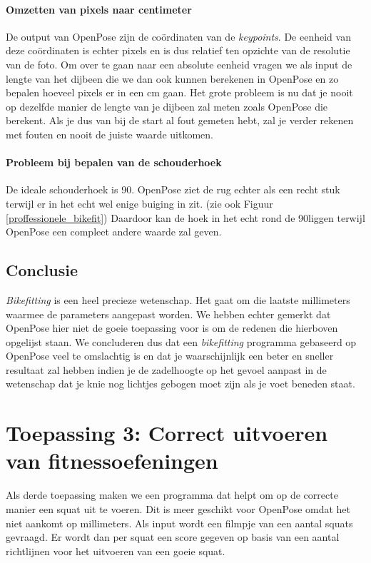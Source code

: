 \documentclass[a4paper,twoside,kulak]{kulakreport}
\begin{document}
\paragraph{Omzetten van pixels naar centimeter}
De output van OpenPose zijn de coördinaten van de \textit{keypoints}. De eenheid van deze coördinaten is echter pixels en is dus relatief ten opzichte van de resolutie van de foto. Om over te gaan naar een absolute eenheid vragen we als input de lengte van het dijbeen die we dan ook kunnen berekenen in OpenPose en zo bepalen hoeveel pixels er in een \si{cm} gaan. Het grote probleem is nu dat je nooit op dezelfde manier de lengte van je dijbeen zal meten zoals OpenPose die berekent. Als je dus van bij de start al fout gemeten hebt, zal je verder rekenen met fouten en nooit de juiste waarde uitkomen.

\paragraph{Probleem bij bepalen van de schouderhoek}
De ideale schouderhoek is 90\degree. OpenPose ziet de rug echter als een recht stuk terwijl er in het echt wel enige buiging in zit. (zie ook Figuur \ref{proffessionele_bikefit}) Daardoor kan de hoek in het echt rond de 90\degree liggen terwijl OpenPose een compleet andere waarde zal geven.

\subsection{Conclusie}
\textit{Bikefitting} is een heel precieze wetenschap. Het gaat om die laatste millimeters waarmee de parameters aangepast worden. We hebben echter gemerkt dat OpenPose hier niet de goeie toepassing voor is om de redenen die hierboven opgelijst staan. We concluderen dus dat een \textit{bikefitting} programma gebaseerd op OpenPose veel te omslachtig is en dat je waarschijnlijk een beter en sneller resultaat zal hebben indien je de zadelhoogte op het gevoel aanpast in de wetenschap dat je knie nog lichtjes gebogen moet zijn als je voet beneden staat.


\section{Toepassing 3: Correct uitvoeren van fitnessoefeningen}

Als derde toepassing maken we een programma dat helpt om op de correcte manier een squat uit te voeren. Dit is meer geschikt voor OpenPose omdat het niet aankomt op millimeters. Als input wordt een filmpje van een aantal squats gevraagd. Er wordt dan per squat een score gegeven op basis van een aantal richtlijnen voor het uitvoeren van een goeie squat.\cite{squats} 
\end{document}
